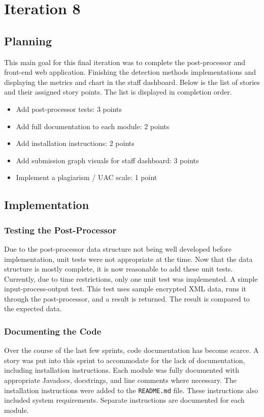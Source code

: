 \chapter{Iteration 8}
\label{it:8}
\section{Planning}
This main goal for this final iteration was to complete the post-processor and front-end web application. Finishing the detection methods implementations and displaying the metrics and chart in the staff dashboard. Below is the list of stories and their assigned story points. The list is displayed in completion order.

\begin{itemize}
\item Add post-processor tests: 3 points
\item Add full documentation to each module: 2 points
\item Add installation instructions: 2 points
\item Add submission graph visuals for staff dashboard: 3 points
\item Implement a plagiarism / UAC scale: 1 point
\end{itemize}

\section{Implementation}
\subsection{Testing the Post-Processor}
Due to the post-processor data structure not being well developed before implementation, unit tests were not appropriate at the time. Now that the data structure is mostly complete, it is now reasonable to add these unit tests. Currently, due to time restrictions, only one unit test was implemented. A simple input-process-output test. This test uses sample encrypted XML data, runs it through the post-processor, and a result is returned. The result is compared to the expected data.

\subsection{Documenting the Code}
Over the course of the last few sprints, code documentation has become scarce. A story was put into this sprint to accommodate for the lack of documentation, including installation instructions. Each module was fully documented with appropriate Javadocs, docstrings, and line comments where necessary. The installation instructions were added to the \texttt{README.md} file. These instructions also included system requirements. Separate instructions are documented for each module.

